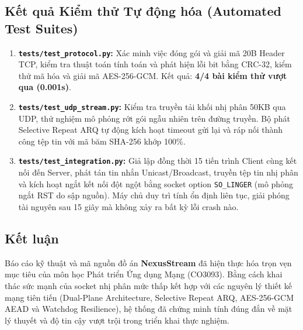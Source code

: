 \documentclass[11pt,a4paper]{article}
\begin{document}
\subsection{Kết quả Kiểm thử Tự động hóa (Automated Test Suites)}
\begin{enumerate}
    \item \textbf{\texttt{tests/test_protocol.py}:} Xác minh việc đóng gói và giải mã 20B Header TCP, kiểm tra thuật toán tính toán và phát hiện lỗi bit bằng CRC-32, kiểm thử mã hóa và giải mã AES-256-GCM. Kết quả: \textbf{4/4 bài kiểm thử vượt qua (0.001s)}.
    \item \textbf{\texttt{tests/test_udp_stream.py}:} Kiểm tra truyền tải khối nhị phân 50KB qua UDP, thử nghiệm mô phỏng rớt gói ngẫu nhiên trên đường truyền. Bộ phát Selective Repeat ARQ tự động kích hoạt timeout gửi lại và ráp nối thành công tệp tin với mã băm SHA-256 khớp 100\%.
    \item \textbf{\texttt{tests/test_integration.py}:} Giả lập đồng thời 15 tiến trình Client cùng kết nối đến Server, phát tán tin nhắn Unicast/Broadcast, truyền tệp tin nhị phân và kích hoạt ngắt kết nối đột ngột bằng socket option \texttt{SO\_LINGER} (mô phỏng ngắt RST do sập nguồn). Máy chủ duy trì tính ổn định liên tục, giải phóng tài nguyên sau 15 giây mà không xảy ra bất kỳ lỗi crash nào.
\end{enumerate}

\subsection{Kết luận}
Báo cáo kỹ thuật và mã nguồn đồ án \textbf{NexusStream} đã hiện thực hóa trọn vẹn mục tiêu của môn học Phát triển Ứng dụng Mạng (CO3093). Bằng cách khai thác sức mạnh của socket nhị phân mức thấp kết hợp với các nguyên lý thiết kế mạng tiên tiến (Dual-Plane Architecture, Selective Repeat ARQ, AES-256-GCM AEAD và Watchdog Resilience), hệ thống đã chứng minh tính đúng đắn về mặt lý thuyết và độ tin cậy vượt trội trong triển khai thực nghiệm.
\end{document}
